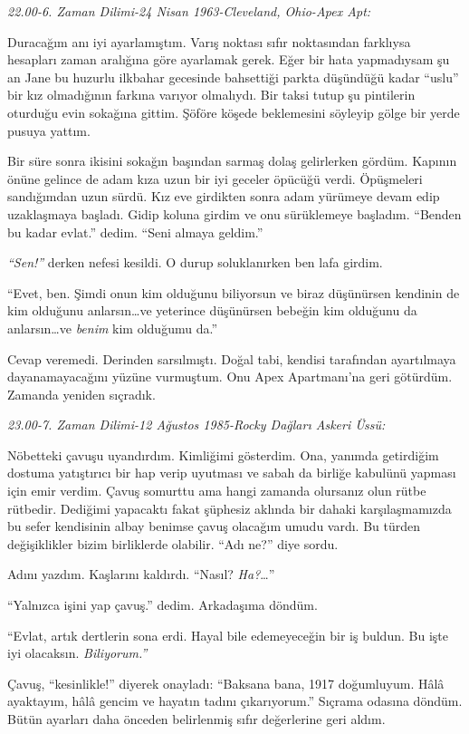 \noindent\emph{22.00-6. Zaman Dilimi-24 Nisan 1963-Cleveland, Ohio-Apex Apt:}

Duracağım anı iyi ayarlamıştım. Varış noktası sıfır noktasından farklıysa
hesapları zaman aralığına göre ayarlamak gerek. Eğer bir hata yapmadıysam şu an
Jane bu huzurlu ilkbahar gecesinde bahsettiği parkta düşündüğü kadar ``uslu''
bir kız olmadığının farkına varıyor olmalıydı. Bir taksi tutup şu pintilerin
oturduğu evin sokağına gittim. Şöföre köşede beklemesini söyleyip gölge bir
yerde pusuya yattım.

Bir süre sonra ikisini sokağın başından sarmaş dolaş gelirlerken gördüm.
Kapının önüne gelince de adam kıza uzun bir iyi geceler öpücüğü verdi.
Öpüşmeleri sandığımdan uzun sürdü. Kız eve girdikten sonra adam yürümeye devam
edip uzaklaşmaya başladı. Gidip koluna girdim ve onu sürüklemeye başladım.
``Benden bu kadar evlat.''  dedim. ``Seni almaya geldim.''

\emph{``Sen!''} derken nefesi kesildi. O durup soluklanırken ben lafa girdim.

``Evet, ben. Şimdi onun kim olduğunu biliyorsun ve biraz düşünürsen kendinin de
kim olduğunu anlarsın\dots ve yeterince düşünürsen bebeğin kim olduğunu da
anlarsın\dots ve \emph{benim} kim olduğumu da.''

Cevap veremedi. Derinden sarsılmıştı. Doğal tabi, kendisi tarafından
ayartılmaya dayanamayacağını yüzüne vurmuştum. Onu Apex Apartmanı'na geri
götürdüm. Zamanda yeniden sıçradık.

\noindent\emph{23.00-7. Zaman Dilimi-12 Ağustos 1985-Rocky Dağları Askeri Üssü:}

Nöbetteki çavuşu uyandırdım. Kimliğimi gösterdim. Ona, yanımda getirdiğim
dostuma yatıştırıcı bir hap verip uyutması ve sabah da birliğe kabulünü yapması
için emir verdim. Çavuş somurttu ama hangi zamanda olursanız olun rütbe
rütbedir. Dediğimi yapacaktı fakat şüphesiz aklında bir dahaki karşılaşmamızda
bu sefer kendisinin albay benimse çavuş olacağım umudu vardı. Bu türden
değişiklikler bizim birliklerde olabilir. ``Adı ne?'' diye sordu.

Adını yazdım. Kaşlarını kaldırdı. ``Nasıl? \emph{Ha?}\dots''

``Yalnızca işini yap çavuş.'' dedim. Arkadaşıma döndüm.

``Evlat, artık dertlerin sona erdi. Hayal bile edemeyeceğin bir iş buldun. Bu
işte iyi olacaksın. \emph{Biliyorum.''}

Çavuş, ``kesinlikle!'' diyerek onayladı: ``Baksana bana, 1917 doğumluyum. Hâlâ
ayaktayım, hâlâ gencim ve hayatın tadını çıkarıyorum.'' Sıçrama odasına döndüm.
Bütün ayarları daha önceden belirlenmiş sıfır değerlerine geri aldım.

